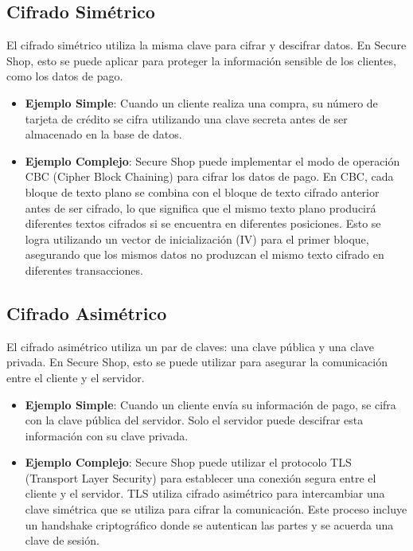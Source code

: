 \subsection{Cifrado Simétrico}

El cifrado simétrico utiliza la misma clave para cifrar y descifrar datos. En Secure Shop, esto se puede aplicar para proteger la información sensible de los clientes, como los datos de pago.

\begin{itemize}
    \item \textbf{Ejemplo Simple}: Cuando un cliente realiza una compra, su número de tarjeta de crédito se cifra utilizando una clave secreta antes de ser almacenado en la base de datos.
    \item \textbf{Ejemplo Complejo}: Secure Shop puede implementar el modo de operación CBC (Cipher Block Chaining) para cifrar los datos de pago. En CBC, cada bloque de texto plano se combina con el bloque de texto cifrado anterior antes de ser cifrado, lo que significa que el mismo texto plano producirá diferentes textos cifrados si se encuentra en diferentes posiciones. Esto se logra utilizando un vector de inicialización (IV) para el primer bloque, asegurando que los mismos datos no produzcan el mismo texto cifrado en diferentes transacciones.
\end{itemize}

\subsection{Cifrado Asimétrico}

El cifrado asimétrico utiliza un par de claves: una clave pública y una clave privada. En Secure Shop, esto se puede utilizar para asegurar la comunicación entre el cliente y el servidor.

\begin{itemize}
    \item \textbf{Ejemplo Simple}: Cuando un cliente envía su información de pago, se cifra con la clave pública del servidor. Solo el servidor puede descifrar esta información con su clave privada.
    \item \textbf{Ejemplo Complejo}: Secure Shop puede utilizar el protocolo TLS (Transport Layer Security) para establecer una conexión segura entre el cliente y el servidor. TLS utiliza cifrado asimétrico para intercambiar una clave simétrica que se utiliza para cifrar la comunicación. Este proceso incluye un handshake criptográfico donde se autentican las partes y se acuerda una clave de sesión.
\end{itemize}

